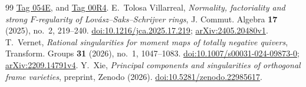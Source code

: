 \documentclass[11pt]{article}
\numberwithin{equation}{section}
\theoremstyle{remark}
\begin{document}
\begin{thebibliography}{99}
\href{https://stacks.math.columbia.edu/tag/054E}{Tag 054E}, and
\href{https://stacks.math.columbia.edu/tag/00R4}{Tag 00R4}.
E.~Tolosa Villarreal,
\emph{Normality, factoriality and strong $F$-regularity of
Lov\'asz--Saks--Schrijver rings},
J. Commut. Algebra \textbf{17} (2025), no.~2, 219--240.
\href{https://doi.org/10.1216/jca.2025.17.219}{doi:10.1216/jca.2025.17.219};
\href{https://arxiv.org/abs/2405.20480v1}{arXiv:2405.20480v1}.
T.~Vernet, \emph{Rational singularities for moment maps of totally
negative quivers}, Transform. Groups \textbf{31} (2026), no.~1, 1047--1083.
\href{https://doi.org/10.1007/s00031-024-09873-0}{doi:10.1007/s00031-024-09873-0};
\href{https://arxiv.org/abs/2209.14791v4}{arXiv:2209.14791v4}.
Y.~Xie,
\emph{Principal components and singularities of orthogonal frame varieties},
preprint, Zenodo (2026).
\href{https://doi.org/10.5281/zenodo.22985617}{doi:10.5281/zenodo.22985617}.
\end{thebibliography}
\end{document}
